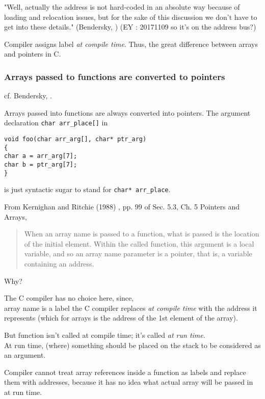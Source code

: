 \documentclass[10pt]{amsart}
\begin{document}
\begin{multicols*}{2}
"Well, actually the address is not hard-coded in an absolute way because of loading and relocation issues, but for the sake of this discussion we don't have to get into these details." (Bendersky, \cite{Bend}) (EY : 20171109 so it's on the address bus?)

Compiler assigns label \emph{at compile time}.  Thus, the great difference between arrays and pointers in C.  

\subsubsection{Arrays passed to functions are converted to pointers}  

cf. Bendersky, \cite{Bend}.  

Arrays passed into functions are always converted into pointers.  The argument declaration \verb|char arr_place[]| in  

\begin{lstlisting}
void foo(char arr_arg[], char* ptr_arg)
{
char a = arr_arg[7];
char b = ptr_arg[7];
}
\end{lstlisting} 

is just syntactic sugar to stand for \verb|char* arr_place|.  

From Kernighan and Ritchie (1988) \cite{KeRi1988}, pp. 99 of Sec. 5.3, Ch. 5 Pointers and Arrays,  

\begin{quotation}
	When an array name is passed to a function, what is passed is the location of the initial element.  Within the called function, this argument is a local variable, and so an array name parameter is a pointer, that is, a variable containing an address.  
\end{quotation}

Why?  

The C compiler has no choice here, since, \\
array name is a label the C compiler replaces \emph{at compile time}  with the address it represents (which for arrays is the address of the 1st element of the array).  

But function isn't called at compile time; it's called \emph{at run time}.  \\
At run time, (where) something should be placed on the stack to be considered as an argument.  

Compiler cannot treat array references inside a function as labels and replace them with addresses, because it has no idea what actual array will be passed in at run time.  


\end{multicols*}
\end{document}
